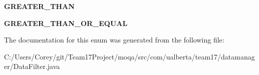 \begin{DoxyCompactItemize}
\item 
\hypertarget{enumcom_1_1ualberta_1_1team17_1_1datamanager_1_1_data_filter_1_1_filter_comparison_ab9d7fa781253f6117ed0018de350675d}{{\bfseries G\+R\+E\+A\+T\+E\+R\+\_\+\+T\+H\+A\+N}}\label{enumcom_1_1ualberta_1_1team17_1_1datamanager_1_1_data_filter_1_1_filter_comparison_ab9d7fa781253f6117ed0018de350675d}

\item 
\hypertarget{enumcom_1_1ualberta_1_1team17_1_1datamanager_1_1_data_filter_1_1_filter_comparison_a5d6ec7aa59437666debbfe8086777773}{{\bfseries G\+R\+E\+A\+T\+E\+R\+\_\+\+T\+H\+A\+N\+\_\+\+O\+R\+\_\+\+E\+Q\+U\+A\+L}}\label{enumcom_1_1ualberta_1_1team17_1_1datamanager_1_1_data_filter_1_1_filter_comparison_a5d6ec7aa59437666debbfe8086777773}

\end{DoxyCompactItemize}


The documentation for this enum was generated from the following file\+:\begin{DoxyCompactItemize}
\item 
C\+:/\+Users/\+Corey/git/\+Team17\+Project/moqa/src/com/ualberta/team17/datamanager/Data\+Filter.\+java\end{DoxyCompactItemize}
